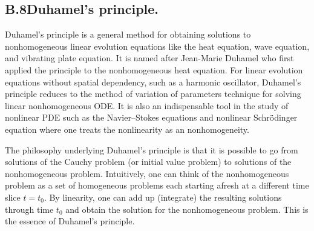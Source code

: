 \documentclass[hyperref,UTF8,12pt]{article}
\numberwithin{equation}{subsection}
\theoremstyle{plain}
\theoremstyle{definition}
\numberwithin{theorem}{section}
\numberwithin{lemma}{section}
\numberwithin{proposition}{section}
\numberwithin{remark}{section}
\numberwithin{corollary}{section}
\numberwithin{definition}{section}
\numberwithin{problem}{section}
\numberwithin{example}{section}
\begin{document}
\begin{appendices}
\subsection*{B.8\quad Duhamel's principle.}\label{Duhamel}
Duhamel's principle is a general method for obtaining solutions to nonhomogeneous linear evolution equations like the heat equation, wave equation, and vibrating plate equation. It is named after Jean-Marie Duhamel who first applied the principle to the nonhomogeneous heat equation. For linear evolution equations without spatial dependency, such as a harmonic oscillator, Duhamel's principle reduces to the method of variation of parameters technique for solving linear nonhomogeneous ODE. It is also an indispensable tool in the study of nonlinear PDE such as the Navier–Stokes equations and nonlinear Schrödinger equation where one treats the nonlinearity as an nonhomogeneity.

The philosophy underlying Duhamel's principle is that it is possible to go from solutions of the Cauchy problem (or initial value problem) to solutions of the nonhomogeneous problem. Intuitively, one can think of the nonhomogeneous problem as a set of homogeneous problems each starting afresh at a different time slice $t=t_0$. By linearity, one can add up (integrate) the resulting solutions through time $t_0$ and obtain the solution for the nonhomogeneous problem. This is the essence of Duhamel's principle.

\end{appendices}
\end{document}
